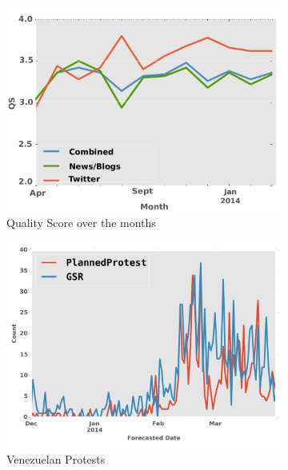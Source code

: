 \documentclass[letterpaper]{article}
\begin{document}
\begin{figure}
\begin{subfigure}{0.40\columnwidth}
    \centering
  \includegraphics[scale=0.2]{monthlyqs}
  \caption{\scriptsize Quality Score over the months}
  \label{fig:monthlyqs}
\end{subfigure}\hspace{.5pt}
\begin{subfigure}{0.40\columnwidth}
    \centering
  \includegraphics[scale=0.2]{venezuela_new}
  \caption{\scriptsize Venezuelan Protests}
  \label{fig:venezuela_feb}
\end{subfigure}\hspace{.5pt}
\begin{subfigure}{0.40\columnwidth}

\end{subfigure}
\end{figure}
\end{document}
